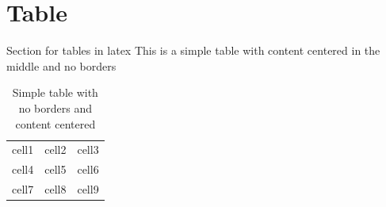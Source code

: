     \section{Table}
    Section for tables in latex
    \newline
    \newline
    This is a simple table with content centered in the middle and 
    no borders
    \begin{table}[h]    %
        \begin{center}
            \begin{tabular}{ c c c }
                cell1 & cell2 & cell3 \\    
                cell4 & cell5 & cell6 \\    
                cell7 & cell8 & cell9       
            \end{tabular}
            \caption{Simple table with no borders and content centered}
            \label{table:simple_table}
        \end{center}
    \end{table}

